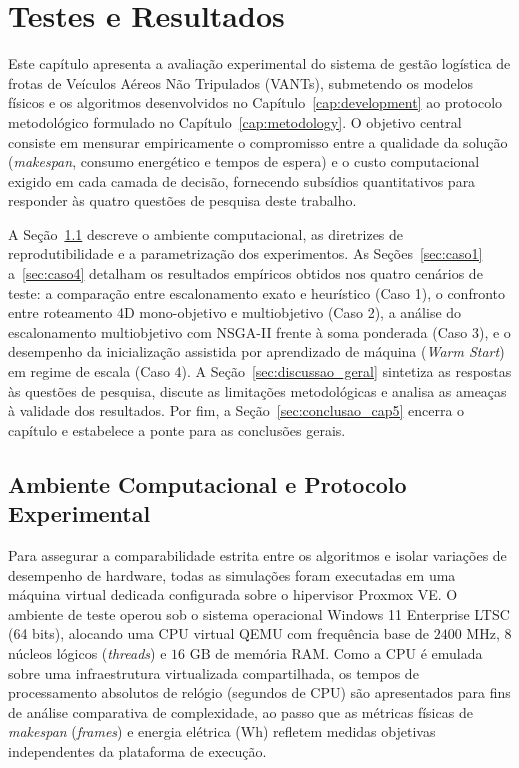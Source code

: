 \chapter{Testes e Resultados}\label{cap:test}

Este capítulo apresenta a avaliação experimental do sistema de gestão logística de frotas de Veículos Aéreos Não Tripulados (VANTs), submetendo os modelos físicos e os algoritmos desenvolvidos no Capítulo~\ref{cap:development} ao protocolo metodológico formulado no Capítulo~\ref{cap:metodology}. O objetivo central consiste em mensurar empiricamente o compromisso entre a qualidade da solução (\textit{makespan}, consumo energético e tempos de espera) e o custo computacional exigido em cada camada de decisão, fornecendo subsídios quantitativos para responder às quatro questões de pesquisa deste trabalho.

A Seção~\ref{sec:ambiente_protocolo} descreve o ambiente computacional, as diretrizes de reprodutibilidade e a parametrização dos experimentos. As Seções~\ref{sec:caso1} a~\ref{sec:caso4} detalham os resultados empíricos obtidos nos quatro cenários de teste: a comparação entre escalonamento exato e heurístico (Caso 1), o confronto entre roteamento 4D mono-objetivo e multiobjetivo (Caso 2), a análise do escalonamento multiobjetivo com NSGA-II frente à soma ponderada (Caso 3), e o desempenho da inicialização assistida por aprendizado de máquina (\textit{Warm Start}) em regime de escala (Caso 4). A Seção~\ref{sec:discussao_geral} sintetiza as respostas às questões de pesquisa, discute as limitações metodológicas e analisa as ameaças à validade dos resultados. Por fim, a Seção~\ref{sec:conclusao_cap5} encerra o capítulo e estabelece a ponte para as conclusões gerais.

\section{Ambiente Computacional e Protocolo Experimental}\label{sec:ambiente_protocolo}

Para assegurar a comparabilidade estrita entre os algoritmos e isolar variações de desempenho de hardware, todas as simulações foram executadas em uma máquina virtual dedicada configurada sobre o hipervisor Proxmox VE. O ambiente de teste operou sob o sistema operacional Windows 11 Enterprise LTSC (64 bits), alocando uma CPU virtual QEMU com frequência base de $2400\text{ MHz}$, $8$ núcleos lógicos (\textit{threads}) e $16\text{ GB}$ de memória RAM. Como a CPU é emulada sobre uma infraestrutura virtualizada compartilhada, os tempos de processamento absolutos de relógio (segundos de CPU) são apresentados para fins de análise comparativa de complexidade, ao passo que as métricas físicas de \textit{makespan} (\textit{frames}) e energia elétrica ($\text{Wh}$) refletem medidas objetivas independentes da plataforma de execução.

